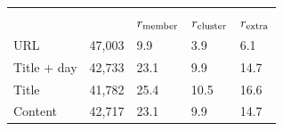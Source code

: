 \begingroup
\PaperTableSetup
\setlength{\tabcolsep}{3.0pt}
\begin{tabularx}{\linewidth}{lrYYY}
\toprule
{}
 & & \\
 &  & $r_{\rm member}$ & $r_{\rm cluster}$ & $r_{\rm extra}$\\
\midrule
{}
URL & 47,003 & 9.9 & 3.9 & 6.1\\
Title + day & 42,733 & 23.1 & 9.9 & 14.7\\
Title & 41,782 & 25.4 & 10.5 & 16.6\\
\midrule
{}
Content & 42,717 & 23.1 & 9.9 & 14.7\\
\bottomrule
\end{tabularx}
\endgroup
